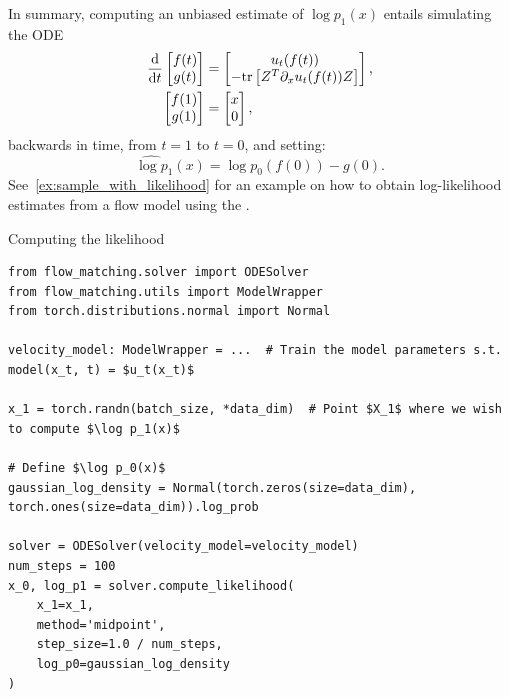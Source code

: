 \documentclass{fairmeta}
\numberwithin{equation}{section}
\begin{document}
In summary, computing an unbiased estimate of $\log p_1(x)$ entails simulating the ODE 
\begin{subequations}\label{e:log_p_1_ode_unbiased}
    \begin{align}
    \frac{\mathrm{d}}{\mathrm{d} t} \left [\begin{matrix}
        f(t) \\ g(t)
    \end{matrix}\right ] &= \left [\begin{matrix}
         u_t(f(t)) \\
         -\textrm{tr}\left [Z^T \partial_x u_t(f(t))Z\right ]
    \end{matrix}\right ],\\
    \left [\begin{matrix}
        f(1) \\ g(1)
    \end{matrix}\right ] &= \left [\begin{matrix}
        x\\ 0
    \end{matrix}\right ],
    \end{align}
\end{subequations}
backwards in time, from $t=1$ to $t=0$, and setting:
\begin{equation}\label{e:log_p_1_unbiased}
    \widehat{\log p}_1(x) = \log p_0(f(0)) - g(0).
\end{equation}
See~\cref{ex:sample_with_likelihood} for an example on how to obtain log-likelihood estimates from a flow model using the \fmlibrary.

\begin{pbox}[label={ex:sample_with_likelihood}]{Computing the likelihood}
\begin{verbatim}
from flow_matching.solver import ODESolver
from flow_matching.utils import ModelWrapper
from torch.distributions.normal import Normal

velocity_model: ModelWrapper = ...  # Train the model parameters s.t. model(x_t, t) = $u_t(x_t)$

x_1 = torch.randn(batch_size, *data_dim)  # Point $X_1$ where we wish to compute $\log p_1(x)$

# Define $\log p_0(x)$
gaussian_log_density = Normal(torch.zeros(size=data_dim), torch.ones(size=data_dim)).log_prob

solver = ODESolver(velocity_model=velocity_model) 
num_steps = 100
x_0, log_p1 = solver.compute_likelihood(
    x_1=x_1, 
    method='midpoint', 
    step_size=1.0 / num_steps, 
    log_p0=gaussian_log_density
)
\end{verbatim}
\end{pbox}
\end{document}
